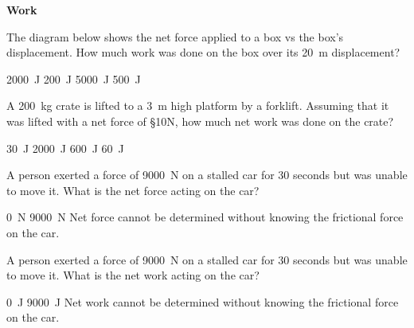 \documentclass[../main-physics-problems.tex]{subfiles}
\begin{document}
\textbf{Work}
\begin{questions}

\question
The diagram below shows the net force applied to a box vs the box's displacement. How much work was done on the box over its \SI{20}{m} displacement?

\begin{center}
\end{center}

\begin{randomizechoices}
    \correctchoice \SI{2000}{J}
    \choice \SI{200}{J}
    \choice \SI{5000}{J}
    \choice \SI{500}{J}
\end{randomizechoices}

\question
A \SI{200}{kg} crate is lifted to a \SI{3}{m} high platform by a forklift. Assuming that it was lifted with a net force of \S{10}{N}, how much net work was done on the crate?

\begin{randomizechoices}
    \correctchoice \SI{30}{J}
    \choice \SI{2000}{J}
    \choice \SI{600}{J}
    \choice \SI{60}{J}
\end{randomizechoices}

\question
A person exerted a force of \SI{9000}{N} on a stalled car for 30 seconds but was unable to move it. What is the net force acting on the car?

\begin{randomizechoices}[keeplast]
    \correctchoice \SI{0}{N}
    \choice \SI{9000}{N}
    \choice Net force cannot be determined without knowing the frictional force on the car.
\end{randomizechoices}

\question
A person exerted a force of \SI{9000}{N} on a stalled car for 30 seconds but was unable to move it. What is the net work acting on the car?

\begin{randomizechoices}[keeplast]
    \correctchoice \SI{0}{J}
    \choice \SI{9000}{J}
    \choice Net work cannot be determined without knowing the frictional force on the car.
\end{randomizechoices}


\end{questions}
\end{document}
